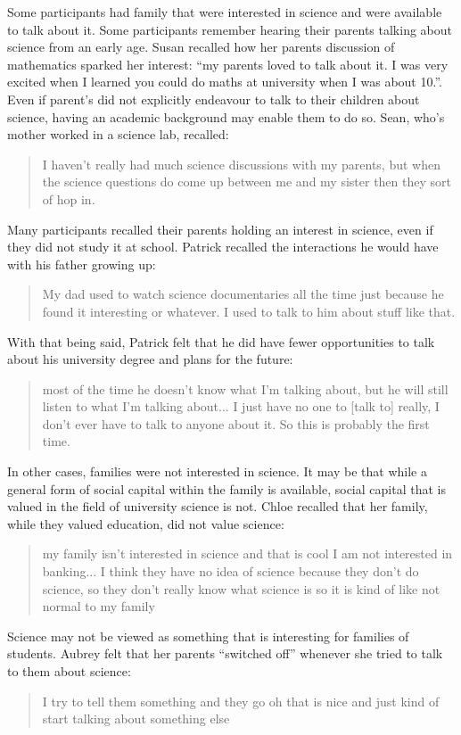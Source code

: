 Some participants had family that were interested in science and were available to  talk about it. Some participants remember hearing their parents talking about science from an early age. Susan recalled how her parents discussion of mathematics sparked her interest: ``my parents loved to talk about it. I was very excited when I learned you could do maths at university when I was about 10.''. Even if parent's did not explicitly endeavour to talk to their children about science, having an academic background may enable them to do so. Sean, who's mother worked in a science lab, recalled: \blockquote{I haven't really had much science discussions with my parents, but when the science questions do come up between me and my sister then they sort of hop in.} Many participants recalled their parents holding an interest in science, even if they did not study it at school. Patrick recalled the interactions he would have with his father growing up: \blockquote{My dad used to watch science documentaries all the time just because he found it interesting or whatever. I used to talk to him about stuff like that.}. With that being said, Patrick felt that he did have fewer opportunities to talk about his university degree and plans for the future: \blockquote{most of the time he doesn't know what I’m talking about, but he will still listen to what I’m talking about...  I just have no one to [talk to] really, I don’t ever have to talk to anyone about it. So this is probably the first time.}

In other cases, families were not interested in science. It may be that while a general form of social capital within the family is available, social capital that is valued in the field of university science is not. Chloe recalled that her family, while they valued education, did not value science: \blockquote{my family isn't interested in science and that is cool I am not interested in banking... I think they have no idea of science because they don't do science, so they don't really know what science is so it is kind of like not normal to my family}. Science may not be viewed as something that is interesting for families of students. Aubrey felt that her parents ``switched off'' whenever she tried to talk to them about science: \blockquote{I try to tell them something and they go oh that is nice and just kind of start talking about something else}.

